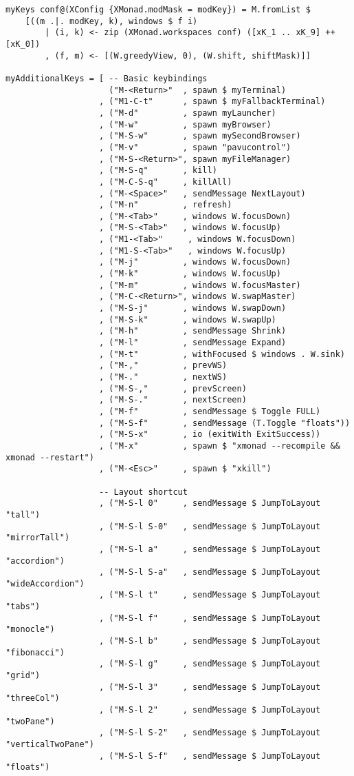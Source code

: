 \documentclass[11pt]{article}
\begin{document}
\begin{verbatim}
myKeys conf@(XConfig {XMonad.modMask = modKey}) = M.fromList $
    [((m .|. modKey, k), windows $ f i)
        | (i, k) <- zip (XMonad.workspaces conf) ([xK_1 .. xK_9] ++ [xK_0])
        , (f, m) <- [(W.greedyView, 0), (W.shift, shiftMask)]]

myAdditionalKeys = [ -- Basic keybindings
                     ("M-<Return>"  , spawn $ myTerminal) 
                   , ("M1-C-t"      , spawn $ myFallbackTerminal)
                   , ("M-d"         , spawn myLauncher)
                   , ("M-w"         , spawn myBrowser)
                   , ("M-S-w"       , spawn mySecondBrowser)
                   , ("M-v"         , spawn "pavucontrol")
                   , ("M-S-<Return>", spawn myFileManager)
                   , ("M-S-q"       , kill)
                   , ("M-C-S-q"     , killAll)
                   , ("M-<Space>"   , sendMessage NextLayout)
                   , ("M-n"         , refresh)
                   , ("M-<Tab>"     , windows W.focusDown)
                   , ("M-S-<Tab>"   , windows W.focusUp)
                   , ("M1-<Tab>"     , windows W.focusDown)
                   , ("M1-S-<Tab>"   , windows W.focusUp)
                   , ("M-j"         , windows W.focusDown)
                   , ("M-k"         , windows W.focusUp)
                   , ("M-m"         , windows W.focusMaster)
                   , ("M-C-<Return>", windows W.swapMaster)
                   , ("M-S-j"       , windows W.swapDown)
                   , ("M-S-k"       , windows W.swapUp)
                   , ("M-h"         , sendMessage Shrink)
                   , ("M-l"         , sendMessage Expand)
                   , ("M-t"         , withFocused $ windows . W.sink)
                   , ("M-,"         , prevWS)
                   , ("M-."         , nextWS)
                   , ("M-S-,"       , prevScreen)
                   , ("M-S-."       , nextScreen)
                   , ("M-f"         , sendMessage $ Toggle FULL)
                   , ("M-S-f"       , sendMessage (T.Toggle "floats"))
                   , ("M-S-x"       , io (exitWith ExitSuccess))
                   , ("M-x"         , spawn $ "xmonad --recompile && xmonad --restart")
                   , ("M-<Esc>"     , spawn $ "xkill")

                   -- Layout shortcut
                   , ("M-S-l 0"     , sendMessage $ JumpToLayout "tall")
                   , ("M-S-l S-0"   , sendMessage $ JumpToLayout "mirrorTall")
                   , ("M-S-l a"     , sendMessage $ JumpToLayout "accordion")
                   , ("M-S-l S-a"   , sendMessage $ JumpToLayout "wideAccordion")
                   , ("M-S-l t"     , sendMessage $ JumpToLayout "tabs")
                   , ("M-S-l f"     , sendMessage $ JumpToLayout "monocle")
                   , ("M-S-l b"     , sendMessage $ JumpToLayout "fibonacci")
                   , ("M-S-l g"     , sendMessage $ JumpToLayout "grid")
                   , ("M-S-l 3"     , sendMessage $ JumpToLayout "threeCol")
                   , ("M-S-l 2"     , sendMessage $ JumpToLayout "twoPane")
                   , ("M-S-l S-2"   , sendMessage $ JumpToLayout "verticalTwoPane")
                   , ("M-S-l S-f"   , sendMessage $ JumpToLayout "floats")


\end{verbatim}
\end{document}
